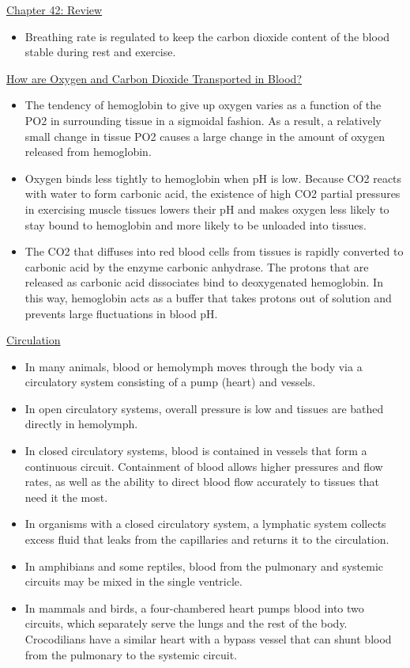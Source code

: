 \documentclass[12pt,letterpaper]{article}
\begin{document}
\begin{probbox}{\hyperlink{42}{Chapter 42: Review}}
{\begin{itemize}
        \item Breathing rate is regulated to keep the carbon dioxide content of the blood stable during rest and exercise.
    \end{itemize}
    \hyperlink{42.4}{How are Oxygen and Carbon Dioxide Transported in Blood?}
    \begin{itemize}
        \item The tendency of hemoglobin to give up oxygen varies as a function of the PO2 in surrounding tissue in a sigmoidal fashion. As a result, a relatively small change in tissue PO2 causes a large change in the amount of oxygen released from hemoglobin. 
        \item Oxygen binds less tightly to hemoglobin when pH is low. Because CO2 reacts with water to form carbonic acid, the existence of high CO2 partial pressures in exercising muscle tissues lowers their pH and makes oxygen less likely to stay bound to hemoglobin and more likely to be unloaded into tissues. 
        \item The CO2 that diffuses into red blood cells from tissues is rapidly converted to carbonic acid by the enzyme carbonic anhydrase. The protons that are released as carbonic acid dissociates bind to deoxygenated hemoglobin. In this way, hemoglobin acts as a buffer that takes protons out of solution and prevents large fluctuations in blood pH.
    \end{itemize}
    \hyperlink{42.5}{Circulation}
    \begin{itemize}
        \item In many animals, blood or hemolymph moves through the body via a circulatory system consisting of a pump (heart) and vessels. 
        \item In open circulatory systems, overall pressure is low and tissues are bathed directly in hemolymph. 
        \item In closed circulatory systems, blood is contained in vessels that form a continuous circuit. Containment of blood allows higher pressures and flow rates, as well as the ability to direct blood flow accurately to tissues that need it the most. 
        \item In organisms with a closed circulatory system, a lymphatic system collects excess fluid that leaks from the capillaries and returns it to the circulation. 
        \item In amphibians and some reptiles, blood from the pulmonary and systemic circuits may be mixed in the single ventricle. 
        \item In mammals and birds, a four-chambered heart pumps blood into two circuits, which separately serve the lungs and the rest of the body. Crocodilians have a similar heart with a bypass vessel that can shunt blood from the pulmonary to the systemic circuit. 

\end{itemize}}
\end{probbox}
\end{document}
